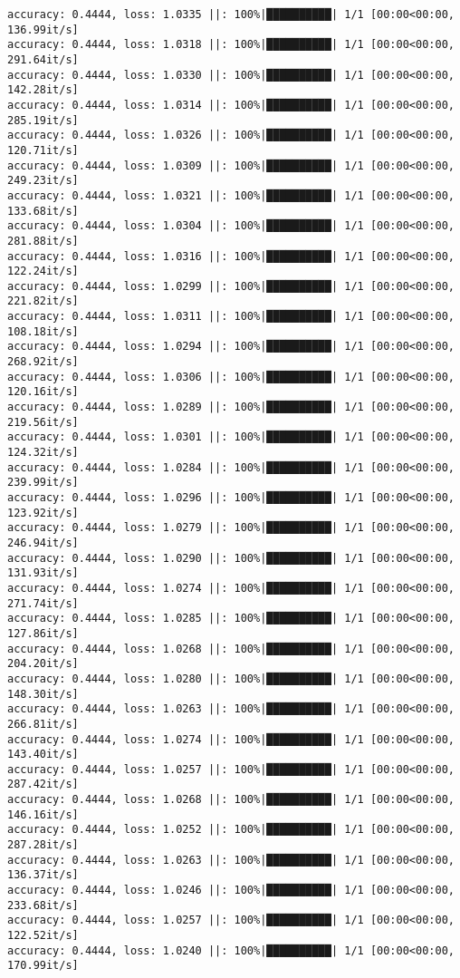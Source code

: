 \documentclass[
]{article}
\begin{document}
\begin{verbatim}
accuracy: 0.4444, loss: 1.0335 ||: 100%|██████████| 1/1 [00:00<00:00, 136.99it/s]
accuracy: 0.4444, loss: 1.0318 ||: 100%|██████████| 1/1 [00:00<00:00, 291.64it/s]
accuracy: 0.4444, loss: 1.0330 ||: 100%|██████████| 1/1 [00:00<00:00, 142.28it/s]
accuracy: 0.4444, loss: 1.0314 ||: 100%|██████████| 1/1 [00:00<00:00, 285.19it/s]
accuracy: 0.4444, loss: 1.0326 ||: 100%|██████████| 1/1 [00:00<00:00, 120.71it/s]
accuracy: 0.4444, loss: 1.0309 ||: 100%|██████████| 1/1 [00:00<00:00, 249.23it/s]
accuracy: 0.4444, loss: 1.0321 ||: 100%|██████████| 1/1 [00:00<00:00, 133.68it/s]
accuracy: 0.4444, loss: 1.0304 ||: 100%|██████████| 1/1 [00:00<00:00, 281.88it/s]
accuracy: 0.4444, loss: 1.0316 ||: 100%|██████████| 1/1 [00:00<00:00, 122.24it/s]
accuracy: 0.4444, loss: 1.0299 ||: 100%|██████████| 1/1 [00:00<00:00, 221.82it/s]
accuracy: 0.4444, loss: 1.0311 ||: 100%|██████████| 1/1 [00:00<00:00, 108.18it/s]
accuracy: 0.4444, loss: 1.0294 ||: 100%|██████████| 1/1 [00:00<00:00, 268.92it/s]
accuracy: 0.4444, loss: 1.0306 ||: 100%|██████████| 1/1 [00:00<00:00, 120.16it/s]
accuracy: 0.4444, loss: 1.0289 ||: 100%|██████████| 1/1 [00:00<00:00, 219.56it/s]
accuracy: 0.4444, loss: 1.0301 ||: 100%|██████████| 1/1 [00:00<00:00, 124.32it/s]
accuracy: 0.4444, loss: 1.0284 ||: 100%|██████████| 1/1 [00:00<00:00, 239.99it/s]
accuracy: 0.4444, loss: 1.0296 ||: 100%|██████████| 1/1 [00:00<00:00, 123.92it/s]
accuracy: 0.4444, loss: 1.0279 ||: 100%|██████████| 1/1 [00:00<00:00, 246.94it/s]
accuracy: 0.4444, loss: 1.0290 ||: 100%|██████████| 1/1 [00:00<00:00, 131.93it/s]
accuracy: 0.4444, loss: 1.0274 ||: 100%|██████████| 1/1 [00:00<00:00, 271.74it/s]
accuracy: 0.4444, loss: 1.0285 ||: 100%|██████████| 1/1 [00:00<00:00, 127.86it/s]
accuracy: 0.4444, loss: 1.0268 ||: 100%|██████████| 1/1 [00:00<00:00, 204.20it/s]
accuracy: 0.4444, loss: 1.0280 ||: 100%|██████████| 1/1 [00:00<00:00, 148.30it/s]
accuracy: 0.4444, loss: 1.0263 ||: 100%|██████████| 1/1 [00:00<00:00, 266.81it/s]
accuracy: 0.4444, loss: 1.0274 ||: 100%|██████████| 1/1 [00:00<00:00, 143.40it/s]
accuracy: 0.4444, loss: 1.0257 ||: 100%|██████████| 1/1 [00:00<00:00, 287.42it/s]
accuracy: 0.4444, loss: 1.0268 ||: 100%|██████████| 1/1 [00:00<00:00, 146.16it/s]
accuracy: 0.4444, loss: 1.0252 ||: 100%|██████████| 1/1 [00:00<00:00, 287.28it/s]
accuracy: 0.4444, loss: 1.0263 ||: 100%|██████████| 1/1 [00:00<00:00, 136.37it/s]
accuracy: 0.4444, loss: 1.0246 ||: 100%|██████████| 1/1 [00:00<00:00, 233.68it/s]
accuracy: 0.4444, loss: 1.0257 ||: 100%|██████████| 1/1 [00:00<00:00, 122.52it/s]
accuracy: 0.4444, loss: 1.0240 ||: 100%|██████████| 1/1 [00:00<00:00, 170.99it/s]

\end{verbatim}
\end{document}
